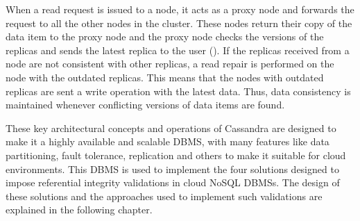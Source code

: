 When a read request is issued to a node,  it acts as a proxy node and forwards
the request to all the other nodes in the cluster.
These nodes return their copy of the data item to the proxy node and the proxy
node  checks the versions of the replicas and sends the latest replica to the
user  ().   If the replicas received from a node are not
consistent with other replicas, a read repair is performed on the node
with the outdated replicas.  This means that the nodes with outdated replicas
are sent a write operation with the latest data.
Thus,  data consistency is maintained whenever conflicting versions of data
items are found.


These key architectural concepts and operations of Cassandra are designed to
make it a highly available and scalable \ac{DBMS},  with many features like data
partitioning,  fault tolerance,  replication and others to make it suitable for
cloud environments.   
This \ac{DBMS} is used to implement the four solutions
designed to impose referential integrity validations in cloud \ac{NoSQL}
\acp{DBMS}.  The design of these solutions  and the approaches used to
implement such validations are explained in the following chapter. 
